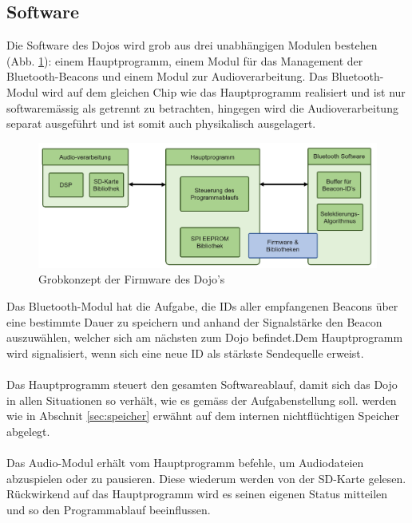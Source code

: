 \documentclass[10pt,a4paper,oneside]{99_fhnwreport}
\begin{document}
\subsection{Software} \label{sec:software}

Die Software des Dojos wird grob aus drei unabhängigen Modulen bestehen (Abb. \ref{fig:grobkonzept}): einem Hauptprogramm, einem Modul für das Management der Bluetooth-Beacons und einem Modul zur Audioverarbeitung. Das Bluetooth-Modul wird auf dem gleichen Chip wie das Hauptprogramm realisiert und ist nur softwaremässig als getrennt zu betrachten, hingegen wird die Audioverarbeitung separat ausgeführt und ist somit auch physikalisch ausgelagert.

\begin{figure}[htb]
\includegraphics[width=\textwidth]{grobkonzept_software.png}
\caption{Grobkonzept der Firmware des Dojo's} %
\label{fig:grobkonzept}
\end{figure}

Das Bluetooth-Modul hat die Aufgabe, die IDs aller empfangenen Beacons über eine bestimmte Dauer zu speichern und anhand der Signalstärke den Beacon auszuwählen, welcher sich am nächsten zum Dojo befindet.Dem Hauptprogramm wird signalisiert, wenn sich eine neue ID als stärkste Sendequelle erweist.\\
\\
Das Hauptprogramm steuert den gesamten Softwareablauf, damit sich das Dojo in allen Situationen so verhält, wie es gemäss der Aufgabenstellung soll. werden wie in Abschnit \ref{sec:speicher} erwähnt auf dem internen nichtflüchtigen Speicher abgelegt.\\
\\
Das Audio-Modul erhält vom Hauptprogramm befehle, um Audiodateien abzuspielen oder zu pausieren. Diese wiederum werden von der SD-Karte gelesen. Rückwirkend auf das Hauptprogramm wird es seinen eigenen Status mitteilen und so den Programmablauf beeinflussen.
\end{document}
